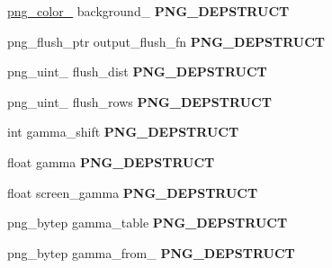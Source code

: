 \begin{DoxyCompactItemize}
\item 
\hypertarget{structpng__struct__def_a80f627516808f53bd5dd7041a3fe1410}{\hyperlink{structpng__color__16__struct}{png\-\_\-color\-\_} background\-\_ {\bfseries P\-N\-G\-\_\-\-D\-E\-P\-S\-T\-R\-U\-C\-T}}\label{structpng__struct__def_a80f627516808f53bd5dd7041a3fe1410}

\item 
\hypertarget{structpng__struct__def_ab802fad7d34e23734d8be5047e64589e}{png\-\_\-flush\-\_\-ptr output\-\_\-flush\-\_\-fn {\bfseries P\-N\-G\-\_\-\-D\-E\-P\-S\-T\-R\-U\-C\-T}}\label{structpng__struct__def_ab802fad7d34e23734d8be5047e64589e}

\item 
\hypertarget{structpng__struct__def_abe47454df3d4103a6f8e1d4bcc03ff7b}{png\-\_\-uint\-\_ flush\-\_\-dist {\bfseries P\-N\-G\-\_\-\-D\-E\-P\-S\-T\-R\-U\-C\-T}}\label{structpng__struct__def_abe47454df3d4103a6f8e1d4bcc03ff7b}

\item 
\hypertarget{structpng__struct__def_a26ad8c12015cb6db5dde1f4ad4ea71dc}{png\-\_\-uint\-\_ flush\-\_\-rows {\bfseries P\-N\-G\-\_\-\-D\-E\-P\-S\-T\-R\-U\-C\-T}}\label{structpng__struct__def_a26ad8c12015cb6db5dde1f4ad4ea71dc}

\item 
\hypertarget{structpng__struct__def_ac1b67606e81ff447791d68badf01c64f}{int gamma\-\_\-shift {\bfseries P\-N\-G\-\_\-\-D\-E\-P\-S\-T\-R\-U\-C\-T}}\label{structpng__struct__def_ac1b67606e81ff447791d68badf01c64f}

\item 
\hypertarget{structpng__struct__def_a024b7f2fef89b0b2190900f70ca65b02}{float gamma {\bfseries P\-N\-G\-\_\-\-D\-E\-P\-S\-T\-R\-U\-C\-T}}\label{structpng__struct__def_a024b7f2fef89b0b2190900f70ca65b02}

\item 
\hypertarget{structpng__struct__def_a57c912a7394bd484815a8cdd6331ffb1}{float screen\-\_\-gamma {\bfseries P\-N\-G\-\_\-\-D\-E\-P\-S\-T\-R\-U\-C\-T}}\label{structpng__struct__def_a57c912a7394bd484815a8cdd6331ffb1}

\item 
\hypertarget{structpng__struct__def_acd7d56e667ffed3fca2e364a40b51db0}{png\-\_\-bytep gamma\-\_\-table {\bfseries P\-N\-G\-\_\-\-D\-E\-P\-S\-T\-R\-U\-C\-T}}\label{structpng__struct__def_acd7d56e667ffed3fca2e364a40b51db0}

\item 
\hypertarget{structpng__struct__def_a3e62e616a5d653151a9b65455483d3b4}{png\-\_\-bytep gamma\-\_\-from\-\_ {\bfseries P\-N\-G\-\_\-\-D\-E\-P\-S\-T\-R\-U\-C\-T}}\label{structpng__struct__def_a3e62e616a5d653151a9b65455483d3b4}


\end{DoxyCompactItemize}
